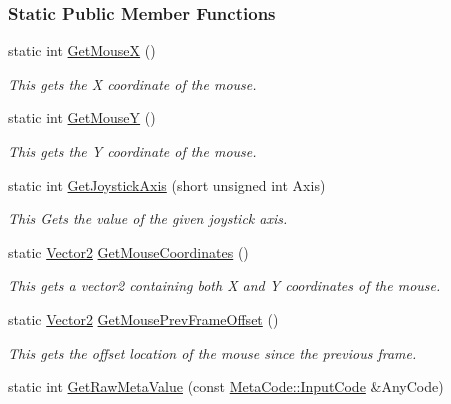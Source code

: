 \subsubsection*{Static Public Member Functions}
\begin{DoxyCompactItemize}
\item 
static int \hyperlink{classphys_1_1InputQueryTool_a1df560487b85fcb90fd9294f3009eee6}{GetMouseX} ()
\begin{DoxyCompactList}\small\item\em This gets the X coordinate of the mouse. \item\end{DoxyCompactList}\item 
static int \hyperlink{classphys_1_1InputQueryTool_a5cab535728ba864a83e7c374cc683d0b}{GetMouseY} ()
\begin{DoxyCompactList}\small\item\em This gets the Y coordinate of the mouse. \item\end{DoxyCompactList}\item 
static int \hyperlink{classphys_1_1InputQueryTool_ae8b922315b271a2eeb376f10a7c97cf4}{GetJoystickAxis} (short unsigned int Axis)
\begin{DoxyCompactList}\small\item\em This Gets the value of the given joystick axis. \item\end{DoxyCompactList}\item 
static \hyperlink{classphys_1_1Vector2}{Vector2} \hyperlink{classphys_1_1InputQueryTool_affd9523f67b542b208e6d36c3395e72b}{GetMouseCoordinates} ()
\begin{DoxyCompactList}\small\item\em This gets a vector2 containing both X and Y coordinates of the mouse. \item\end{DoxyCompactList}\item 
static \hyperlink{classphys_1_1Vector2}{Vector2} \hyperlink{classphys_1_1InputQueryTool_aea2da0aeb97353f9d7af75f2a8cb7d91}{GetMousePrevFrameOffset} ()
\begin{DoxyCompactList}\small\item\em This gets the offset location of the mouse since the previous frame. \item\end{DoxyCompactList}\item 
static int \hyperlink{classphys_1_1InputQueryTool_a44ad555f277bf035648fb1eeddb94514}{GetRawMetaValue} (const \hyperlink{classphys_1_1MetaCode_a3e501cbb5bf0f6f1fdb7211465bda8d8}{MetaCode::InputCode} \&AnyCode)

\end{DoxyCompactItemize}
